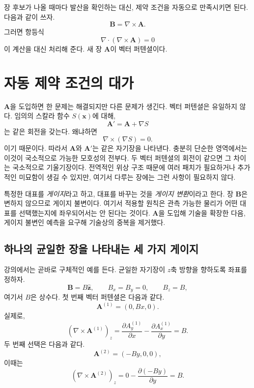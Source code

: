 장 후보가 나올 때마다 발산을 확인하는 대신, 제약 조건을 자동으로 만족시키면 된다. 다음과 같이 쓰자.
\begin{equation}
  \boxed{\mathbf B=\nabla\times\mathbf A}.
\end{equation}
그러면 항등식
\begin{equation}
  \nabla\cdot(\nabla\times\mathbf A)=0
\end{equation}
이 계산을 대신 처리해 준다. 새 장 \(\mathbf A\)이 벡터 퍼텐셜이다.

\section{자동 제약 조건의 대가}

\(\mathbf A\)을 도입하면 한 문제는 해결되지만 다른 문제가 생긴다. 벡터 퍼텐셜은 유일하지 않다. 임의의 스칼라 함수 \(S(\mathbf x)\)에 대해,
\begin{equation}
  \mathbf A'=\mathbf A+\nabla S
\end{equation}
는 같은 회전을 갖는다. 왜냐하면
\begin{equation}
  \nabla\times(\nabla S)=0.
\end{equation}
이기 때문이다. 따라서 \(\mathbf A\)와 \(\mathbf A'\)는 같은 자기장을 나타낸다. 충분히 단순한 영역에서는 이것이 국소적으로 가능한 모호성의 전부다. 두 벡터 퍼텐셜의 회전이 같으면 그 차이는 국소적으로 기울기장이다. 전역적인 위상 구조 때문에 여러 패치가 필요하거나 추가적인 미묘함이 생길 수 있지만, 여기서 다루는 장에는 그런 사항이 필요하지 않다.

특정한 대표를 \emph{게이지}라고 하고, 대표를 바꾸는 것을 \emph{게이지 변환}이라고 한다. 장 \(\mathbf B\)은 변하지 않으므로 게이지 불변이다. 여기서 적용할 원칙은 관측 가능한 물리가 어떤 대표를 선택했는지에 좌우되어서는 안 된다는 것이다. \(\mathbf A\)을 도입해 기술을 확장한 다음, 게이지 불변인 예측을 요구해 기술상의 중복을 제거했다.

\subsection{하나의 균일한 장을 나타내는 세 가지 게이지}

강의에서는 곧바로 구체적인 예를 든다. 균일한 자기장이 \(z\)축 방향을 향하도록 좌표를 정하자.
\begin{equation}
  \mathbf B=B\hat{\mathbf z},
  \qquad
  B_x=B_y=0,
  \qquad
  B_z=B,
\end{equation}
여기서 \(B\)은 상수다. 첫 번째 벡터 퍼텐셜은 다음과 같다.
\begin{equation}
  \mathbf A^{(1)}=(0,Bx,0).
\end{equation}
실제로,
\begin{equation}
  (\nabla\times\mathbf A^{(1)})_z
  =
  \frac{\partial A_y^{(1)}}{\partial x}
  -
  \frac{\partial A_x^{(1)}}{\partial y}
  =B.
\end{equation}
두 번째 선택은 다음과 같다.
\begin{equation}
  \mathbf A^{(2)}=(-By,0,0),
\end{equation}
이때는
\begin{equation}
  (\nabla\times\mathbf A^{(2)})_z
  =
  0-\frac{\partial(-By)}{\partial y}
  =B.
\end{equation}

